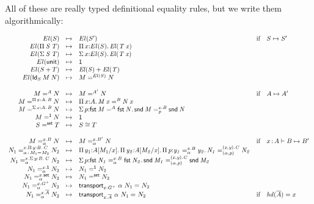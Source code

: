 All of these are really typed definitional equality rules, but we write
them algorithmically:

\begin{small}
\[
\begin{array}{rclll}
\el{S} & \mapsto & \el{S'} & \text{if} & S \mapsto S' \\
\el{\picd{S}{T}} & \mapsto & \picl{x}{\el{S}}{\el{\app T x}} \\
\el{\sigmacd{S}{T}} & \mapsto & \sigmacl{x}{\el{S}}{\el{\app T x}} \\
\el{\unitcd} & \mapsto & \unit \\
\el{\smcd{S}{T}} & \mapsto & \sm{\el{S}}{\el{T}} \\
\el{\idcd{S}{M}{N}} & \mapsto & \iid{\el{S}}{M}{N} 
\\ \\

\iid{A}{M}{N} & \mapsto & \iid{A'}{M}{N} & \text{if} & A \mapsto A' \\
\iid{\picl{x}{A}{B}}{M}{N} & \mapsto & \picl{x}{A}{\iid{B}{\app M x}{\app N x}} & \\
\iid{\sigmacl{x}{A}{B}}{M}{N} & \mapsto & \sigmacl{p}{\iid{A}{\fst M}{\fst N}}{\iidover{x.B}{p}{\snd M}{\snd N}} & \\
\iid{\unit}{M}{N} & \mapsto & \unit \\
\iid{\set}{S}{T} & \mapsto & \equivset{S}{T} 
\\ \\

\iidover{x.B}{\alpha}{M}{N} & \mapsto & \iidover{x.B'}{\alpha}{M}{N} & \text{if} & \tptm{x}{A} \vdash B \mapsto B'\\
\iidover{x.\picl{y}{B}{C}}{\tptm{\alpha}{\iid{}{M_1}{M_2}}}{N_1}{N_2} & \mapsto & \picl{y_1}{\subst{A}{M_1}{x}}{\picl{y_2}{\subst{A}{M_2}{x}}{\picl{p}{\iidover{x.B}{\alpha}{y_1}{y_2}}{\iidover{(x,y).C}{(\alpha,p)}{N_1}{N_2}}}} \\
\iidover{x.\sigmacl{y}{B}{C}}{\alpha}{N_1}{N_2} & \mapsto & \sigmacl{p}{\iidover{x.B}{\alpha}{\fst{N_1}}{\fst{N_2}}}{\iidover{(x,y).C}{(\alpha,p)}{\snd{M_1}}{\snd{M_2}}} \\
\iidover{x.\unit}{\alpha}{N_1}{N_2} & \mapsto & \iid{\unit}{N_1}{N_2} \\
\iidover{x.\set}{\alpha}{N_1}{N_2} & \mapsto & \iid{\set}{N_1}{N_2} \\
\iidover{x.G\ep}{\alpha}{N_1}{N_2} & \mapsto & \iid{}{\transport{x.G\ep}{\alpha}{N_1}}{N_2} \\
\iidover{x.\neu{A}}{\alpha}{N_1}{N_2} & \mapsto &
\iid{}{\transport{x.\neu{A}}{\alpha}{N_1}}{N_2} & \text{if} & \hd{\neu{A}} = x\\
\end{array}
\]
\end{small}

